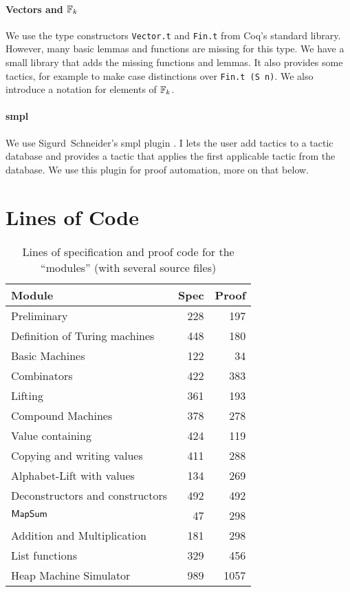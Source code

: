 \paragraph{Vectors and $\mathbb{F}_k$}

We use the type constructors \lstinline!Vector.t! and \lstinline!Fin.t! from Coq's standard library.  However, many basic lemmas and functions are
missing for this type.  We have a small library that adds the missing functions and lemmas.  It also provides some tactics, for example to make case
distinctions over \lstinline!Fin.t (S n)!.  We also introduce a notation for elements of $\mathbb{F}_k$.

\paragraph{smpl}

We use Sigurd~Schneider's smpl plugin \cite{SMPL}.  I lets the user add tactics to a tactic database and provides a tactic that applies the first
applicable tactic from the database.  We use this plugin for proof automation, more on that below.


\section{Lines of Code}
\label{sec:coq-lines}

\begin{table}[h]
  \centering
  \begin{tabular}{l|r|r}
    Module                          & Spec & Proof \\ \hline
    Preliminary                     &  228 &   197 \\
    Definition of Turing machines   &  448 &   180 \\
    Basic Machines                  &  122 &    34 \\
    Combinators                     &  422 &   383 \\
    Lifting                         &  361 &   193 \\
    Compound Machines               &  378 &   278 \\
    Value containing                &  424 &   119 \\
    Copying and writing values      &  411 &   288 \\
    Alphabet-Lift with values       &  134 &   269 \\
    Deconstructors and constructors &  492 &   492 \\
    $\mathsf{MapSum}$                   &   47 &   298 \\
    Addition and Multiplication     &  181 &   298 \\
    List functions                  &  329 &   456 \\
    Heap Machine Simulator          &  989 &  1057 \\
  \end{tabular}
  \caption{Lines of specification and proof code for the ``modules'' (with several source files)}
  \label{tab:coq-lines}
\end{table}




